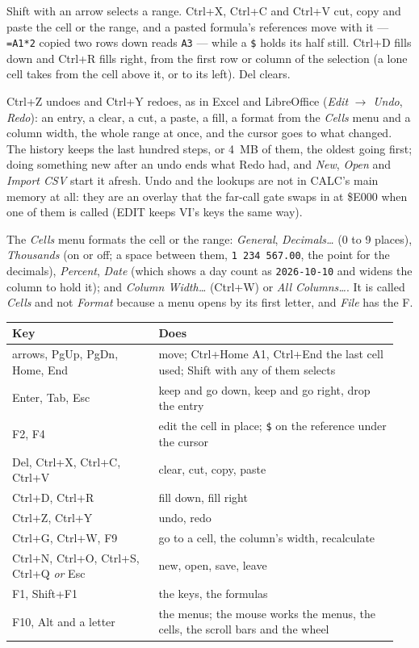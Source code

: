 Shift with an arrow selects a range. Ctrl+X, Ctrl+C and Ctrl+V cut, copy
and paste the cell or the range, and a pasted formula's references move with
it --- \verb|=A1*2| copied two rows down reads \verb|A3| --- while a
\verb|$| holds its half still. Ctrl+D fills down and Ctrl+R fills right, from
the first row or column of the selection (a lone cell takes from the cell
above it, or to its left). Del clears.

Ctrl+Z undoes and Ctrl+Y redoes, as in Excel and LibreOffice (\emph{Edit}
$\rightarrow$ \emph{Undo}, \emph{Redo}): an entry, a clear, a cut, a
paste, a fill, a format from the \emph{Cells} menu and a column width, the
whole range at once, and the cursor goes to what changed. The history keeps
the last hundred steps, or 4~MB of them, the oldest going first; doing
something new after an undo ends what Redo had, and \emph{New}, \emph{Open}
and \emph{Import CSV} start it afresh. Undo and the lookups are not in
CALC's main memory at all: they are an overlay that the far-call gate
swaps in at \$E000 when one of them is called (EDIT keeps VI's keys the
same way).

The \emph{Cells} menu formats the cell or the range: \emph{General},
\emph{Decimals\ldots} (0 to 9 places), \emph{Thousands} (on or off; a space between them, \texttt{1 234 567.00}, the point for the decimals), \emph{Percent},
\emph{Date} (which shows a day count as \texttt{2026-10-10} and widens the
column to hold it); and \emph{Column Width\ldots} (Ctrl+W) or \emph{All
Columns\ldots}. It is called \emph{Cells} and not \emph{Format} because a
menu opens by its first letter, and \emph{File} has the F.

\begin{center}
\small
\begin{tabular}{@{}>{\raggedright\arraybackslash}p{0.36\linewidth} >{\raggedright\arraybackslash}p{0.59\linewidth}@{}}
\toprule
\textbf{Key} & \textbf{Does} \\
\midrule
arrows, PgUp, PgDn, Home, End & move; Ctrl+Home A1, Ctrl+End the last cell used; Shift with any of them selects \\
Enter, Tab, Esc & keep and go down, keep and go right, drop the entry \\
F2, F4 & edit the cell in place; \verb|$| on the reference under the cursor \\
Del, Ctrl+X, Ctrl+C, Ctrl+V & clear, cut, copy, paste \\
Ctrl+D, Ctrl+R & fill down, fill right \\
Ctrl+Z, Ctrl+Y & undo, redo \\
Ctrl+G, Ctrl+W, F9 & go to a cell, the column's width, recalculate \\
Ctrl+N, Ctrl+O, Ctrl+S, Ctrl+Q \emph{or} Esc & new, open, save, leave \\
F1, Shift+F1 & the keys, the formulas \\
F10, Alt and a letter & the menus; the mouse works the menus, the cells, the scroll bars and the wheel \\
\bottomrule
\end{tabular}
\end{center}

